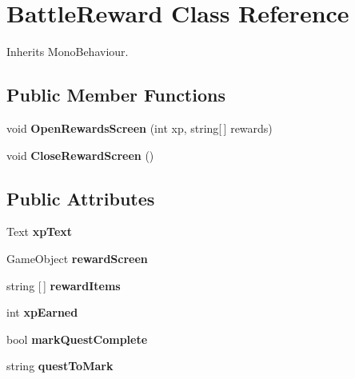 \hypertarget{class_battle_reward}{}\section{Battle\+Reward Class Reference}
\label{class_battle_reward}


Inherits Mono\+Behaviour.

\subsection*{Public Member Functions}
\begin{DoxyCompactItemize}
\item 
\mbox{\label{class_battle_reward_a166a1f7d4babd844d82c4878923099f1}} 
void {\bfseries Open\+Rewards\+Screen} (int xp, string\mbox{[}$\,$\mbox{]} rewards)
\item 
\mbox{\label{class_battle_reward_ac295f72b5bb881c930b0bf29822ae023}} 
void {\bfseries Close\+Reward\+Screen} ()
\end{DoxyCompactItemize}
\subsection*{Public Attributes}
\begin{DoxyCompactItemize}
\item 
\mbox{\label{class_battle_reward_a6cf74b9f9f1b7055b81f0bf98f79f676}} 
Text {\bfseries xp\+Text}
\item 
\mbox{\label{class_battle_reward_ab9fb4c3e65d172477f0e944c6fead91e}} 
Game\+Object {\bfseries reward\+Screen}
\item 
\mbox{\label{class_battle_reward_a45e31fb84e334926d67dea0ea89b250b}} 
string \mbox{[}$\,$\mbox{]} {\bfseries reward\+Items}
\item 
\mbox{\label{class_battle_reward_ac465a0797433323664b541377f3172de}} 
int {\bfseries xp\+Earned}
\item 
\mbox{\label{class_battle_reward_a537f3383a772a65ef3046102a773dbdb}} 
bool {\bfseries mark\+Quest\+Complete}
\item 
\mbox{\label{class_battle_reward_a0514f572e99fd99686c8a4cd81a6a8eb}} 
string {\bfseries quest\+To\+Mark}
\end{DoxyCompactItemize}
